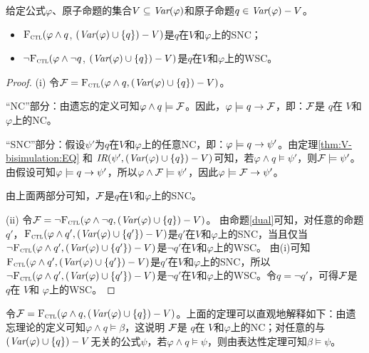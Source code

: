 \begin{theorem}\label{thm:SNC:WSC:forget}
	给定公式$\varphi$、原子命题的集合$V\subseteq\textit{Var}(\varphi)$和原子命题$q\in\textit{Var}(\varphi)- V$。
	\begin{itemize}
		\item[(i)] ${\textsc{F}_{\textsc{ctl}}} (\varphi \land q$, $(\textit{Var}(\varphi) \cup \{q\}) - V)$是$q$在$V$和$\varphi$上的SNC；
		\item[(ii)]  $\neg{\textsc{F}_{\textsc{ctl}}} (\varphi \land \neg q$, $(\textit{Var}(\varphi) \cup \{q\}) - V)$是$q$在$V$和$\varphi$上的WSC。
	\end{itemize}
\end{theorem}
\begin{proof}
	(i) 令${\cal F}={\textsc{F}_{\textsc{ctl}}}(\varphi \wedge q, (\textit{Var}(\varphi) \cup \{q\})- V)$。
	
	
	“NC”部分：由遗忘的定义可知$\varphi \wedge q \models {\cal F}$。因此，$\varphi\models q \rightarrow {\cal F}$，即：${\cal F}$是 $q$在 $V$和$\varphi$上的NC。
	
	“SNC”部分：假设$\psi'$为$q$在$V$和$\varphi$上的任意NC，即：$\varphi\models q \rightarrow \psi'$。由定理\ref{thm:V-bisimulation:EQ} 和 $\emph{IR}(\psi', (\textit{Var}(\varphi) \cup \{q\})- V)$可知，若$\varphi \wedge q \models \psi'$，则${\cal F} \models \psi'$。
	由假设可知$\varphi\models q \rightarrow \psi'$，所以$\varphi \wedge {\cal F} \models \psi'$，因此$\varphi \models {\cal F} \rightarrow \psi'$。
	
	由上面两部分可知，${\cal F}$是$q$在$V$和$\varphi$上的SNC。
	
	(ii) 令${\cal F}=\neg {\textsc{F}_{\textsc{ctl}}}(\varphi \wedge \neg q, (\textit{Var}(\varphi) \cup \{q\})- V)$。
	由命题\ref{dual}可知，对任意的命题$q'$，${\textsc{F}_{\textsc{ctl}}}(\varphi \wedge q', (\textit{Var}(\varphi) \cup \{q'\})- V)$是$q'$在$V$和$\varphi$上的SNC，当且仅当
	$\neg {\textsc{F}_{\textsc{ctl}}}(\varphi \wedge q', (\textit{Var}(\varphi) \cup \{q'\})- V)$是$\neg q'$在$V$和$\varphi$上的WSC。
	由(i)可知${\textsc{F}_{\textsc{ctl}}}(\varphi \wedge q', (\textit{Var}(\varphi) \cup \{q'\})- V)$是$q'$在$V$和$\varphi$上的SNC，所以$\neg {\textsc{F}_{\textsc{ctl}}}(\varphi \wedge q', (\textit{Var}(\varphi) \cup \{q'\})- V)$是$\neg q'$在$V$和$\varphi$上的WSC。令$q=\neg q'$，可得${\cal F}$是 $q$在 $V$和 $\varphi$上的WSC。
\end{proof}

令${\cal F}={\textsc{F}_{\textsc{ctl}}}(\varphi \wedge q, (\textit{Var}(\varphi) \cup \{q\})- V)$。上面的定理可以直观地解释如下：由遗忘理论的定义可知$\varphi \wedge q \models \beta$，这说明
${\cal F}$是 $q$在 $V$和$\varphi$上的NC；对任意的与$(\textit{Var}(\varphi) \cup \{q\})- V$无关的公式$\psi$，若$\varphi \wedge q \models \psi$，则由表达性定理可知$\beta \models \psi$。

